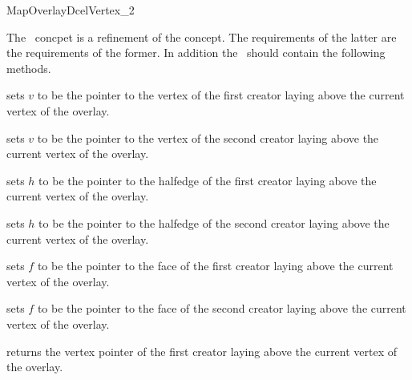 
\ccRefPageBegin


\begin{ccRefConcept}{MapOverlayDcelVertex_2}


The \ccRefName\ concpet is a refinement of the  concept. 
The requirements of the latter are the requirements of the former.
In addition the \ccRefName\ should contain the following methods.

  \ccOperations
  {sets $v$ to be the pointer to the vertex of the first creator laying above the current vertex of the overlay.}
  
  {sets $v$ to be the pointer to the vertex of the second creator laying above the current vertex of the overlay.}
  
  {sets $h$ to be the pointer to the halfedge of the first creator laying above the current vertex of the overlay.}

  {sets $h$ to be the pointer to the halfedge of the second creator laying above the current vertex of the overlay.}

  {sets $f$ to be the pointer to the face of the first creator laying above the current vertex of the overlay.}
  
  {sets $f$ to be the pointer to the face of the second creator laying above the current vertex of the overlay.}
  
  {returns the vertex pointer of the first creator laying above the current vertex of the overlay.}
  

\end{ccRefConcept}
